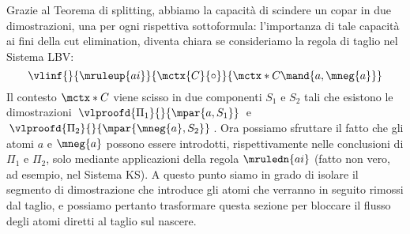 \documentclass[12pt,a4paper,openright,twoside]{report}
\begin{document}
Grazie al Teorema di splitting, abbiamo la capacit\`a di scindere un copar in due dimostrazioni, una per ogni rispettiva sottoformula: l'importanza di tale capacit\`a ai fini della cut elimination, diventa chiara se consideriamo la regola di taglio nel Sistema \textsf{LBV}:
$$
	\vlinf{}{\mruleup{ai}}{\mctx{C}{\circ}}{\mctx*{C}\mand{a, \mneg{a}}}
$$
Il contesto $\mctx*{C}$ viene scisso in due componenti $S_1$ e $S_2$ tali che esistono le dimostrazioni $\:\vlproofd{\Pi_1}{}{\mpar{a, S_1}}\:$ e $\:\vlproofd{\Pi_2}{}{\mpar{\mneg{a}, S_2}}\:$. Ora possiamo sfruttare il fatto che gli atomi $a$ e $\mneg{a}$ possono essere introdotti, rispettivamente nelle conclusioni di $\Pi_1$ e $\Pi_2$, solo mediante applicazioni della regola $\mruledn{ai}$ (fatto non vero, ad esempio, nel Sistema \textsf{KS}). A questo punto siamo in grado di isolare il segmento di dimostrazione che introduce gli atomi che verranno in seguito rimossi dal taglio, e possiamo pertanto trasformare questa sezione per bloccare il flusso degli atomi diretti al taglio sul nascere.
\end{document}
